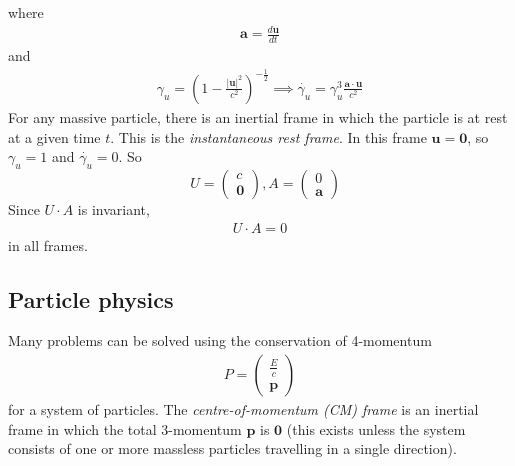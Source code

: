 \documentclass[a4paper]{article}
\begin{document}
where
\begin{equation*}
\begin{aligned}
\mathbf{a} = \frac{d\mathbf{u}}{dt}
\end{aligned}
\end{equation*}
and
\begin{equation*}
\begin{aligned}
\gamma_u = \left(1-\frac{|\mathbf{u}|^2}{c^2}\right)^{-\frac{1}{2}} \implies \dot{\gamma_u} = \gamma_u^3 \frac{\mathbf{a}\cdot\mathbf{u}}{c^2}
\end{aligned}
\end{equation*}
For any massive particle, there is an inertial frame in which the particle is at rest at a given time $t$. This is the \emph{instantaneous rest frame}. In this frame $\mathbf{u} = \mathbf{0}$, so $\gamma_u = 1$ and $\dot{\gamma_u} = 0$. So
\begin{equation*}
\begin{aligned}
\end{aligned}
U = \left(\begin{array}{ll}
c\\
\mathbf{0}
\end{array}\right),A=\left(\begin{array}{ll}
0\\
\mathbf{a}
\end{array}\right)
\end{equation*}
Since $U\cdot A$ is invariant,
\begin{equation*}
\begin{aligned}
U\cdot A = 0
\end{aligned}
\end{equation*}
in all frames.

\subsection{Particle physics}
Many problems can be solved using the conservation of 4-momentum
\begin{equation*}
\begin{aligned}
P=\left(\begin{array}{ll}
\frac{E}{c}\\
\mathbf{p}
\end{array}\right)
\end{aligned}
\end{equation*}
for a system of particles. The \emph{centre-of-momentum (CM) frame} is an inertial frame in which the total 3-momentum $\mathbf{p}$ is $\mathbf{0}$ (this exists unless the system consists of one or more massless particles travelling in a single direction).
\end{document}
